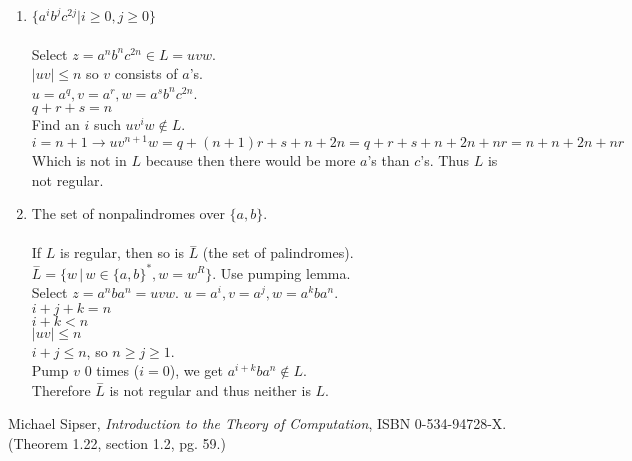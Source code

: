 \documentclass[10pt,a4paper,final]{article}
\begin{document}
\begin{enumerate}
\begin{enumerate}
  \item $\{a^i b^j c^{2j} | i \geq 0, j \geq 0\}$\\
  \\
  Select $z = a^n b^n c^{2n} \in L = uvw$.\\
  $|uv| \leq n$ so $v$ consists of $a$'s.\\
  $u = a^q, v = a^r, w = a^s b^n c^{2n}$.\\
  $q + r + s = n$\\
  Find an $i$ such $uv^iw \notin L$.\\
  $i = n+1 \rightarrow uv^{n+1}w = q + (n+1)r + s + n + 2n = q + r +s + n + 2n + nr = n + n + 2n + nr$\\
  Which is not in $L$ because then there would be more $a$'s than $c$'s. Thus $L$ is not regular.  
  
  \item The set of nonpalindromes over $\{a,b\}$.\\
  \\
  If $L$ is regular, then so is $\stackrel{-}{L}$ (the set of palindromes).\\
  $\stackrel{-}{L} = \{w\,|\,w \in \{a,b\}^*, w = w^R\}$. Use pumping lemma.\\
  Select $z = a^n b a^n = uvw$. $u = a^i, v=a^j, w=a^k b a^n$.\\
  $i+j+k=n$\\
  $i+k < n$\\
  $|uv| \leq n$\\
  $i + j \leq n$, so $n \geq j \geq 1$.\\
  Pump $v$ 0 times ($i=0$), we get $a^{i+k}b a^n \notin L$.\\
  Therefore $\stackrel{-}{L}$ is not regular and thus neither is $L$.
  \end{enumerate}
\end{enumerate}

\begin{thebibliography}{}
  Michael Sipser,
  \emph{Introduction to the Theory of Computation},
  ISBN 0-534-94728-X.
  (Theorem 1.22, section 1.2, pg. 59.)
\end{thebibliography}
\end{document}

